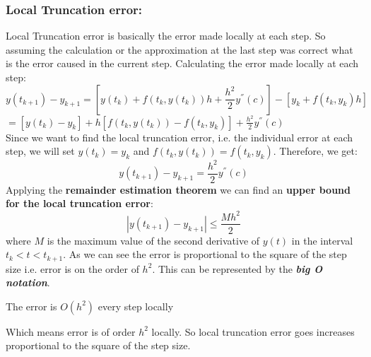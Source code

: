 \documentclass[11pt,a4paper]{amsart}
\begin{document}
\subsubsection{Local Truncation error:}\cite{atkinson, boyce, buchanan} Local Truncation error is basically the error made locally at each step. So assuming the calculation or the approximation at the last step was correct what is the error caused in the current step. Calculating the error made locally at each step:
$$y(t_{k+1}) - y_{k+1} = [y(t_k) + f(t_k, y(t_k))h + \frac{h^2}{2}y^{''}(c)] - [y_k + f(t_k, y_k)h]$$
\vspace{14px}
\hspace{140px} $\displaystyle = [y(t_k)-y_k] + h[f(t_k,y(t_k)) - f(t_k, y_k)] + \frac{h^2}{2}y^{''}(c)$\\
Since we want to find the local truncation error, i.e. the individual error at each step, we will set $y(t_k) = y_k$ and $f(t_k, y(t_k)) = f(t_k, y_k)$. Therefore, we get:
$$y(t_{k+1}) - y_{k+1} = \frac{h^2}{2}y^{''}(c)$$
Applying the {\bf remainder estimation theorem}\cite{thomas} we can find an {\bf upper bound for the local truncation error}:
$$|y(t_{k+1}) - y_{k+1}| \leq \frac{Mh^2}{2}$$
where $M$ is the maximum value of the second derivative of $y(t)$ in the interval $t_k < t < t_{k+1}$.
As we can see the error is proportional to the square of the step size i.e. error is on the order of $h^2$. This can be represented by the {\em \bf big O notation}.
\begin{tcolorbox}
	The error is $O(h^2)$ every step locally
\end{tcolorbox}
Which means error is of order $h^2$ locally. So local truncation error goes increases proportional to the square of the step size.
\end{document}
